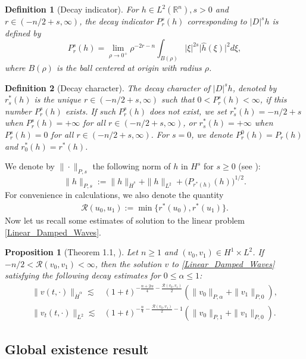 \documentclass[11pt,reqno]{amsart}
\newtheorem{definition}{Definition}[section]
\newtheorem{proposition}{Proposition}[section]
\begin{document}
\begin{definition}[Decay indicator] \label{definition_2.1} For $h \in L^2\left(\mathbb{R}^n\right), s>0$ and $r \in(-n / 2+s, \infty)$, the decay indicator $P_r^s(h)$ corresponding to $|D|^s h$ is defined by
$$
P_r^s(h)=\lim _{\rho \rightarrow 0^+} \rho^{-2 r-n} \int_{B(\rho)}|\xi|^{2 s}\big|\widehat{h}(\xi)\big|^2 d \xi,
$$
where $B(\rho)$ is the ball centered at origin with radius $\rho$.
\end{definition} 
\begin{definition}[Decay character] \label{definition_2.2} The decay character of $|D|^s h$, denoted by $r_s^*\left(h\right)$ is the unique $r \in(-n / 2+s, \infty)$ such that $0<P_r^s\left(h\right)<\infty$, if this number $P_r^s\left(h\right)$ exists. If such $P_r^s\left(h\right)$ does not exist, we set $r_s^*(h)=-n / 2+s$ when $P_r^s\left(h\right)=+\infty$ for all $r \in(-n / 2+s, \infty)$, or $r_s^*(h)=+\infty$ when $P_r^s(h)=0$ for all $r \in(-n / 2+s, \infty)$.
For $s=0$, we denote $P_r^0\left(h\right)=P_r\left(h\right)$ and $r_0^*(h)=r^*(h)$.
\end{definition}
\noindent We denote by $\|\cdot\|_{P,s}$ the following norm of $h$ in $H^s$ for $s\geq 0$ (see \cite{ADL2024}):
\[
\|h\|_{P,s}:=\|h\|_{\dot{H}^s}+\|h\|_{L^2}+\big(P_{r^*(h)}(h)\big)^{1/2}.
\]
For convenience in calculations, we also denote the quantity
\begin{align*}
    \mathcal{R}(u_0, u_1) := \min\{r^*(u_0), r^*(u_1)\}.
\end{align*}
Now let us recall some estimates of solution to the linear problem \eqref{Linear_Damped_Waves}. 
\begin{proposition}[Theorem 1.1, \cite{ADL2024}] \label{Decay_Linear_Positive order}
Let $n \geq 1$ and $(v_0,v_1)\in H^1\times L^2$. If $-n/2<\mathcal{R}(v_0,v_1)<\infty$, then the solution $v$ to \eqref{Linear_Damped_Waves} satisfying the following decay estimates for $0\leq \alpha\leq 1$:
\begin{align*}
\|v(t,\cdot)\|_{\dot{H}^\alpha} \lesssim &(1+t)^{-\frac{n+2\alpha}{4}-\frac{\mathcal{R}(v_0, v_1)}{2}} (\|v_0\|_{P,\alpha} +\|v_1\|_{P,0}),\\
\|v_t(t,\cdot)\|_{L^2} \lesssim &(1+t)^{-\frac{n}{4}-\frac{\mathcal{R}(v_0, v_1)}{2}-1}(\|v_0\|_{P,1} +\|v_1\|_{P,0}).
\end{align*}
\end{proposition}
\subsection{Global existence result}
\end{document}
